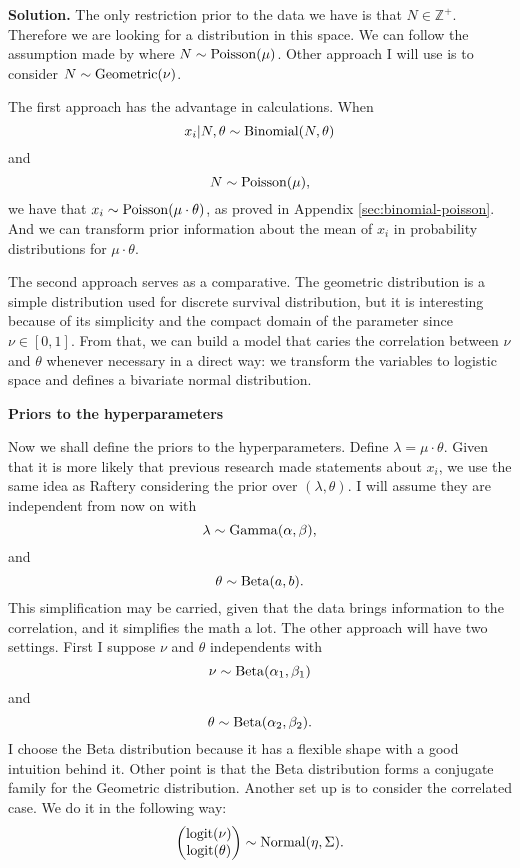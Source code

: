 \vspace{2ex}

    {\bf Solution.} The only restriction prior to the data we have is that $N \in
    \mathbb{Z}^+$. Therefore we are looking for a distribution in this space.
    We can follow the assumption made by \cite{Raftery1988} where $N \sim
    \operatorname{Poisson}(\mu)$. Other approach I will use is to consider $N \sim \operatorname{Geometric}(\nu)$.

    The first approach has the advantage in calculations. When 
    $$x_i | N, \theta \sim \operatorname{Binomial}(N,\theta)$$ and $$N \sim \operatorname{Poisson}(\mu),$$ we have that $x_i \sim
    \operatorname{Poisson}(\mu\cdot\theta)$, as proved in Appendix \ref{sec:binomial-poisson}.
    And we can transform prior information about the mean of $x_i$ in
    probability distributions for $\mu\cdot\theta$.

    \ind The second approach serves as a comparative. The geometric
    distribution is a simple distribution used for discrete survival
    distribution, but it is interesting because of its simplicity and the
    compact domain of the parameter since $\nu \in [0,1]$. 
    From that, we
    can build a model that caries the correlation between $\nu$ and $\theta$
    whenever necessary in a direct way: we transform the variables to logistic
    space and defines a bivariate normal distribution.

    \vspace{2ex}

    {\bf Priors to the hyperparameters}

    \vspace{2ex}

    Now we shall define the priors to the hyperparameters. Define $\lambda =
    \mu\cdot\theta$. Given that it is more likely that previous research made
    statements about $x_i$, we use the same idea as Raftery considering the
    prior over $(\lambda, \theta)$. I will assume they are independent from
    now on with 
    $$
    \lambda \sim \operatorname{Gamma}(\alpha, \beta),
    $$
    and
    $$
    \theta \sim \operatorname{Beta}(a,b).
    $$
    This simplification may be carried, given that the data brings information
    to the correlation, and it simplifies the math a lot.
    The other approach will have two settings. First I suppose $\nu$ and
    $\theta$ independents with 
    $$
    \nu \sim \operatorname{Beta}(\alpha_1, \beta_1)
    $$
    and
    $$
    \theta \sim \operatorname{Beta}(\alpha_2, \beta_2).
    $$
    I choose the Beta distribution because it has a flexible shape with
    a good intuition behind it. Other point is that the Beta distribution
    forms a conjugate family for the Geometric distribution. Another set up is
    to consider the correlated case. We do it in the following way:
    $$
    \begin{pmatrix}
        \operatorname{logit}(\nu) \\ \operatorname{logit}(\theta) 
    \end{pmatrix} \sim \operatorname{Normal}(\eta, \Sigma).
    $$

